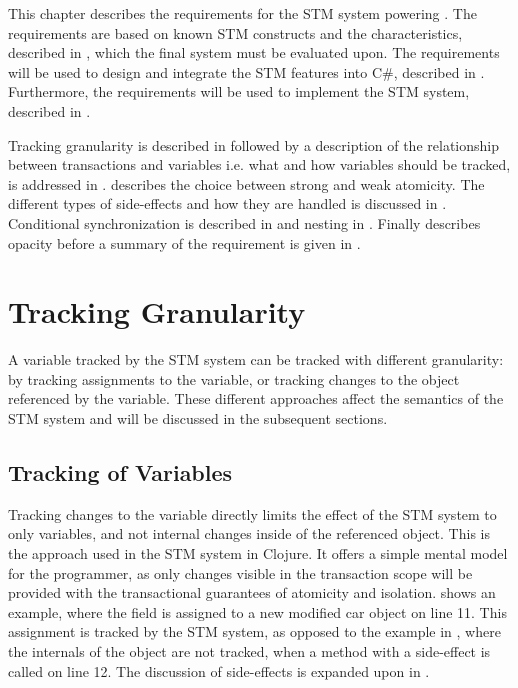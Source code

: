 \makeatletter {}\makeatother
{}
This chapter describes the requirements for the \ac{STM} system powering \stmname. The requirements are based on known \ac{STM} constructs and the characteristics, described in , which the final system must be evaluated upon. The requirements will be used to design and integrate the \ac{STM} features into C\#, described in . Furthermore, the requirements will be used to implement the \ac{STM} system, described in .

Tracking granularity is described in  followed by a description of the relationship between transactions and variables i.e. what and how variables should be tracked, is addressed in .  describes the choice between strong and weak atomicity. The different types of side-effects and how they are handled is discussed in . Conditional synchronization is described in  and nesting in . Finally  describes opacity before a summary of the requirement is given in .
\label{sec:stm_requirements}

\section{Tracking Granularity}\label{sec:tracking}
A variable tracked by the \ac{STM} system can be tracked with different granularity: by tracking assignments to the variable, or tracking changes to the object referenced by the variable. These different approaches affect the semantics of the \ac{STM} system and will be discussed in the subsequent sections.

\subsection{Tracking of Variables}
Tracking changes to the variable directly limits the effect of the \ac{STM} system to only variables, and not internal changes inside of the referenced object. This is the approach used in the \ac{STM} system in Clojure\cite{clojureConcurrent}. It offers a simple mental model for the programmer, as only changes visible in the transaction scope will be provided with the transactional guarantees of atomicity and isolation.   shows an example, where the field  is assigned to a new modified car object on line 11. This assignment is tracked by the \ac{STM} system, as opposed to the example in , where the internals of the object are not tracked, when a method with a side-effect is called on line 12. The discussion of side-effects is expanded upon in .

